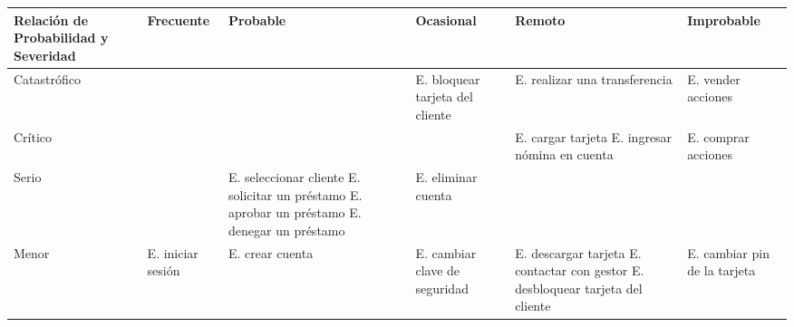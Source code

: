 \begin{adjustwidth}{0cm}{-8cm}
	\begin{multicols}{2}
		\begin{table}[H]
			\fontsize{8}{9}\selectfont
			\centering
			\begin{tabularx}{0.7\textwidth}{|>{\centering}X|>{\centering}X|>{\centering}X|>{\centering}X|>{\centering}X|X|}
				\hline
				Relación de Probabilidad y Severidad & Frecuente                                         & Probable                                              & Ocasional                                             & Remoto                                               & Improbable                               \\
				\hline
				Catastrófico                         & \cellcolor{riskred}                               & \cellcolor{riskred}                                   & \cellcolor{riskred}E. bloquear tarjeta del cliente    & \cellcolor{riskyellow} E. realizar una transferencia & \cellcolor{riskgreen} E. vender acciones \\
				\hline
				Crítico                              & \cellcolor{riskred}                               & \cellcolor{riskred}                                   & \cellcolor{riskyellow}                                & \cellcolor{riskgreen} E. cargar tarjeta \newline
				E. ingresar nómina en cuenta         & \cellcolor{riskpurple}E. comprar acciones                                                                                                                                                                                                                           \\
				\hline
				Serio                                & \cellcolor{riskyellow}                            & \cellcolor{riskyellow} E. seleccionar cliente\newline
				E. solicitar un préstamo\newline
				E. aprobar un préstamo\newline
				E. denegar un préstamo\newline       & \cellcolor{riskgreen} E. eliminar cuenta          & \cellcolor{riskpurple}                                & \cellcolor{riskblue}                                                                                                                                    \\
				\hline
				Menor                                & \cellcolor{riskgreen} E. iniciar sesión           & \cellcolor{riskgreen}E. crear cuenta                  & \cellcolor{riskpurple}E. cambiar clave de seguridad   & \cellcolor{riskblue} E. descargar tarjeta\newline
				E. contactar con gestor\newline
				E. desbloquear tarjeta del cliente   & \cellcolor{riskblue} E. cambiar pin de la tarjeta                                                                                                                                                                                                                   \\
				\hline


\end{tabularx}
\end{table}
\end{multicols}
\end{adjustwidth}
